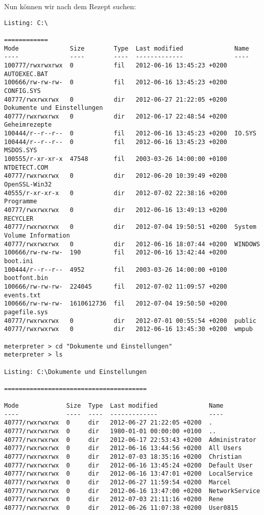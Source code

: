 Nun können wir nach dem Rezept suchen:
\begin{lstlisting}[language=Metasploit]
Listing: C:\

============
Mode              Size        Type  Last modified              Name
----              ----        ----  -------------              ----
100777/rwxrwxrwx  0           fil   2012-06-16 13:45:23 +0200  AUTOEXEC.BAT
100666/rw-rw-rw-  0           fil   2012-06-16 13:45:23 +0200  CONFIG.SYS
40777/rwxrwxrwx   0           dir   2012-06-27 21:22:05 +0200  Dokumente und Einstellungen
40777/rwxrwxrwx   0           dir   2012-06-17 22:48:54 +0200  Geheimrezepte
100444/r--r--r--  0           fil   2012-06-16 13:45:23 +0200  IO.SYS
100444/r--r--r--  0           fil   2012-06-16 13:45:23 +0200  MSDOS.SYS
100555/r-xr-xr-x  47548       fil   2003-03-26 14:00:00 +0100  NTDETECT.COM
40777/rwxrwxrwx   0           dir   2012-06-20 10:39:49 +0200  OpenSSL-Win32
40555/r-xr-xr-x   0           dir   2012-07-02 22:38:16 +0200  Programme
40777/rwxrwxrwx   0           dir   2012-06-16 13:49:13 +0200  RECYCLER
40777/rwxrwxrwx   0           dir   2012-07-04 19:50:51 +0200  System Volume Information
40777/rwxrwxrwx   0           dir   2012-06-16 18:07:44 +0200  WINDOWS
100666/rw-rw-rw-  190         fil   2012-06-16 13:42:44 +0200  boot.ini
100444/r--r--r--  4952        fil   2003-03-26 14:00:00 +0100  bootfont.bin
100666/rw-rw-rw-  224045      fil   2012-07-02 11:09:57 +0200  events.txt
100666/rw-rw-rw-  1610612736  fil   2012-07-04 19:50:50 +0200  pagefile.sys
40777/rwxrwxrwx   0           dir   2012-07-01 00:55:54 +0200  public
40777/rwxrwxrwx   0           dir   2012-06-16 13:45:30 +0200  wmpub

meterpreter > cd "Dokumente und Einstellungen"
meterpreter > ls

Listing: C:\Dokumente und Einstellungen

=======================================

Mode             Size  Type  Last modified              Name
----             ----  ----  -------------              ----
40777/rwxrwxrwx  0     dir   2012-06-27 21:22:05 +0200  .
40777/rwxrwxrwx  0     dir   1980-01-01 00:00:00 +0100  ..
40777/rwxrwxrwx  0     dir   2012-06-17 22:53:43 +0200  Administrator
40777/rwxrwxrwx  0     dir   2012-06-16 13:44:56 +0200  All Users
40777/rwxrwxrwx  0     dir   2012-07-03 18:35:16 +0200  Christian
40777/rwxrwxrwx  0     dir   2012-06-16 13:45:24 +0200  Default User
40777/rwxrwxrwx  0     dir   2012-06-16 13:47:01 +0200  LocalService
40777/rwxrwxrwx  0     dir   2012-06-27 11:59:54 +0200  Marcel
40777/rwxrwxrwx  0     dir   2012-06-16 13:47:00 +0200  NetworkService
40777/rwxrwxrwx  0     dir   2012-07-03 21:11:16 +0200  Rene
40777/rwxrwxrwx  0     dir   2012-06-26 11:07:38 +0200  User0815


\end{lstlisting}
